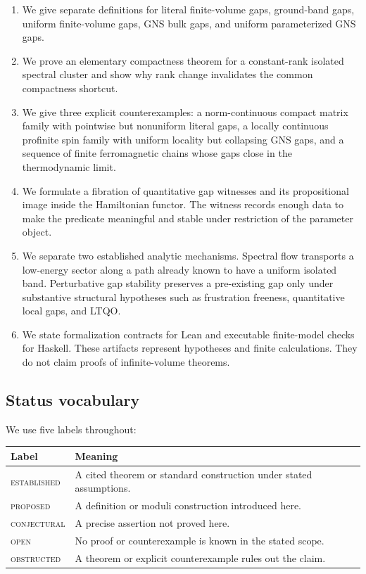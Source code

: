 \documentclass[12pt]{article}
\theoremstyle{definition}
\theoremstyle{remark}
\newcommand{\status}[1]{\textsc{#1}}
\begin{document}
\begin{enumerate}[label=\arabic*.]
  \item We give separate definitions for literal finite-volume gaps,
  ground-band gaps, uniform finite-volume gaps, GNS bulk gaps, and uniform
  parameterized GNS gaps.

  \item We prove an elementary compactness theorem for a constant-rank
  isolated spectral cluster and show why rank change invalidates the common
  compactness shortcut.

  \item We give three explicit counterexamples: a norm-continuous compact
  matrix family with pointwise but nonuniform literal gaps, a locally
  continuous profinite spin family with uniform locality but collapsing GNS
  gaps, and a sequence of finite ferromagnetic chains whose gaps close in the
  thermodynamic limit.

  \item We formulate a fibration of quantitative gap witnesses and its
  propositional image inside the Hamiltonian functor. The witness records
  enough data to make the predicate meaningful and stable under restriction
  of the parameter object.

  \item We separate two established analytic mechanisms. Spectral flow
  transports a low-energy sector along a path already known to have a uniform
  isolated band. Perturbative gap stability preserves a pre-existing gap only
  under substantive structural hypotheses such as frustration freeness,
  quantitative local gaps, and LTQO.

  \item We state formalization contracts for Lean and executable finite-model
  checks for Haskell. These artifacts represent hypotheses and finite
  calculations. They do not claim proofs of infinite-volume theorems.
\end{enumerate}

\subsection{Status vocabulary}

We use five labels throughout:

\begin{center}
\begin{tabular}{ll}
\toprule
Label & Meaning \\
\midrule
\status{established} & A cited theorem or standard construction under stated assumptions.\\
\status{proposed} & A definition or moduli construction introduced here.\\
\status{conjectural} & A precise assertion not proved here.\\
\status{open} & No proof or counterexample is known in the stated scope.\\
\status{obstructed} & A theorem or explicit counterexample rules out the claim.\\
\bottomrule
\end{tabular}
\end{center}
\end{document}
